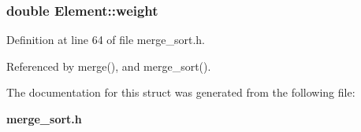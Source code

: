 \subsubsection{\setlength{\rightskip}{0pt plus 5cm}double \bf{Element::weight}}\label{structElement_53932a07f3f7b9f5e69c6bfb38d25f5f}




Definition at line 64 of file merge\_\-sort.h.

Referenced by merge(), and merge\_\-sort().

The documentation for this struct was generated from the following file:\begin{CompactItemize}
\item 
\bf{merge\_\-sort.h}\end{CompactItemize}
